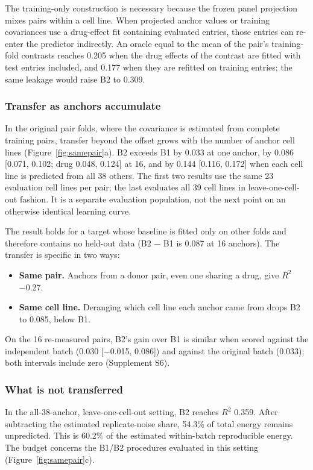 \documentclass[11pt]{article}
\begin{document}
The training-only construction is necessary because the frozen panel projection mixes pairs within a cell line. When projected anchor values or training covariances use a drug-effect fit containing evaluated entries, those entries can re-enter the predictor indirectly. An oracle equal to the mean of the pair's training-fold contrasts reaches 0.205 when the drug effects of the contrast are fitted with test entries included, and 0.177 when they are refitted on training entries; the same leakage would raise B2 to 0.309.

\subsubsection*{Transfer as anchors accumulate} In the original pair folds, where the covariance is estimated from complete training pairs, transfer beyond the offset grows with the number of anchor cell lines (Figure~\ref{fig:samepair}a). B2 exceeds B1 by 0.033 at one anchor, by 0.086 [0.071, 0.102; drug 0.048, 0.124] at 16, and by 0.144 [0.116, 0.172] when each cell line is predicted from all 38 others. The first two results use the same 23 evaluation cell lines per pair; the last evaluates all 39 cell lines in leave-one-cell-out fashion. It is a separate evaluation population, not the next point on an otherwise identical learning curve.

The result holds for a target whose baseline is fitted only on other folds and therefore contains no held-out data (B2 − B1 is 0.087 at 16 anchors). The transfer is specific in two ways:
\begin{itemize}
\item \textbf{Same pair.} Anchors from a donor pair, even one sharing a drug, give $R^2$ −0.27.
\item \textbf{Same cell line.} Deranging which cell line each anchor came from drops B2 to 0.085, below B1.
\end{itemize}
On the 16 re-measured pairs, B2's gain over B1 is similar when scored against the independent batch (0.030 [−0.015, 0.086]) and against the original batch (0.033); both intervals include zero (Supplement S6).

\subsubsection*{What is not transferred} In the all-38-anchor, leave-one-cell-out setting, B2 reaches $R^2$ 0.359. After subtracting the estimated replicate-noise share, 54.3\% of total energy remains unpredicted. This is 60.2\% of the estimated within-batch reproducible energy. The budget concerns the B1/B2 procedures evaluated in this setting (Figure~\ref{fig:samepair}c).
\end{document}
